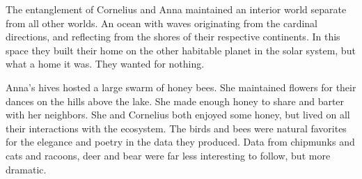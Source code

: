 The entanglement of Cornelius and Anna maintained an interior world
separate from all other worlds.  An ocean with waves originating from
the cardinal directions, and reflecting from the shores of their
respective continents.  In this space they built their home on the
other habitable planet in the solar system, but what a home it was.
They wanted for nothing.

\bigskip

Anna's hives hosted a large swarm of honey bees.  She maintained
flowers for their dances on the hills above the lake.  She made enough
honey to share and barter with her neighbors.  She and Cornelius both
enjoyed some honey, but lived on all their interactions with the
ecosystem.  The birds and bees were natural favorites for the elegance
and poetry in the data they produced.  Data from chipmunks and cats
and racoons, deer and bear were far less interesting to follow, but
more dramatic.  

\bye
